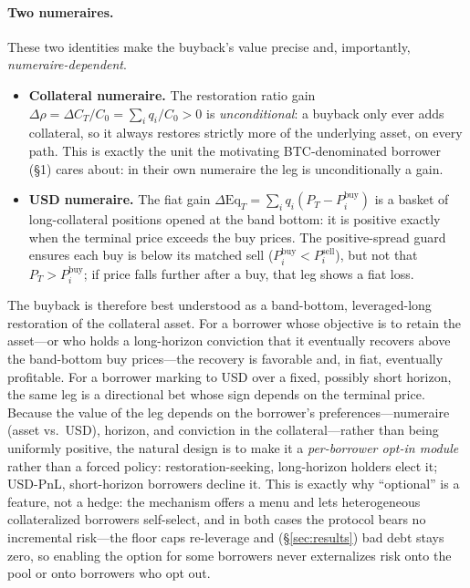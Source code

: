 \documentclass[12pt]{article}
\begin{document}
\paragraph{Two numeraires.} These two identities make the buyback's value precise and, importantly, \emph{numeraire-dependent}.
\begin{itemize}
\item \textbf{Collateral numeraire.} The restoration ratio gain $\Delta\rho=\Delta C_T/C_0=\sum_i q_i/C_0>0$ is \emph{unconditional}: a buyback only ever adds collateral, so it always restores strictly more of the underlying asset, on every path. This is exactly the unit the motivating BTC-denominated borrower (\S1) cares about: in their own numeraire the leg is unconditionally a gain.
\item \textbf{USD numeraire.} The fiat gain $\Delta\mathrm{Eq}_T=\sum_i q_i(P_T-P_i^{\text{buy}})$ is a basket of long-collateral positions opened at the band bottom: it is positive exactly when the terminal price exceeds the buy prices. The positive-spread guard ensures each buy is below its matched sell ($P_i^{\text{buy}}<P_i^{\text{sell}}$), but not that $P_T>P_i^{\text{buy}}$; if price falls further after a buy, that leg shows a fiat loss.
\end{itemize}
The buyback is therefore best understood as a band-bottom, leveraged-long restoration of the collateral asset. For a borrower whose objective is to retain the asset---or who holds a long-horizon conviction that it eventually recovers above the band-bottom buy prices---the recovery is favorable and, in fiat, eventually profitable. For a borrower marking to USD over a fixed, possibly short horizon, the same leg is a directional bet whose sign depends on the terminal price. Because the value of the leg depends on the borrower's preferences---numeraire (asset vs.\ USD), horizon, and conviction in the collateral---rather than being uniformly positive, the natural design is to make it a \emph{per-borrower opt-in module} rather than a forced policy: restoration-seeking, long-horizon holders elect it; USD-PnL, short-horizon borrowers decline it. This is exactly why ``optional'' is a feature, not a hedge: the mechanism offers a menu and lets heterogeneous collateralized borrowers self-select, and in both cases the protocol bears no incremental risk---the floor caps re-leverage and (\S\ref{sec:results}) bad debt stays zero, so enabling the option for some borrowers never externalizes risk onto the pool or onto borrowers who opt out.
\end{document}
